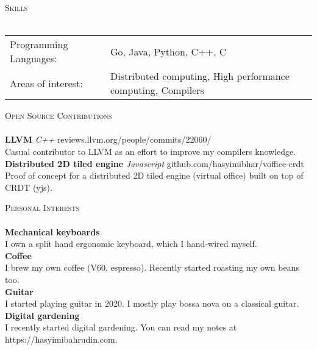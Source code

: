 \documentclass[a4paper]{article}
\newcommand{\lineunder} {
    \vspace*{-8pt} \\
    \hspace*{-18pt} \hrulefill \\
}
\newcommand{\header} [1] {
    {\hspace*{-18pt}\vspace*{6pt} \textsc{#1}}
    \vspace*{-6pt} \lineunder
}
\begin{document}
\header{Skills}
\begin{tabular}{ l l }
	Programming Languages: & Go, Java, Python, C++, C                                     \\
	Areas of interest:     & Distributed computing, High performance computing, Compilers \\
\end{tabular}
\vspace{2mm}

\header{Open Source Contributions}
{\textbf{LLVM}} {\sl C++} \hfill reviews.llvm.org/people/commits/22060/\\
Casual contributor to LLVM as an effort to improve my compilers knowledge.\\
\vspace*{2mm}
{\textbf{Distributed 2D tiled engine}} {\sl Javascript} \hfill github.com/hasyimibhar/voffice-crdt\\
Proof of concept for a distributed 2D tiled engine (virtual office) built on top of CRDT (yjs).\\
\vspace*{2mm}

\header{Personal Interests}
{\textbf{Mechanical keyboards}} \\
I own a split hand ergonomic keyboard, which I hand-wired myself.\\
\vspace*{2mm}
{\textbf{Coffee}} \\
I brew my own coffee (V60, espresso). Recently started roasting my own beans too.\\
\vspace*{2mm}
{\textbf{Guitar}} \\
I started playing guitar in 2020. I mostly play bossa nova on a classical guitar.\\
\vspace*{2mm}
{\textbf{Digital gardening}} \\
I recently started digital gardening. You can read my notes at https://hasyimibahrudin.com.
\ 
\end{document}
